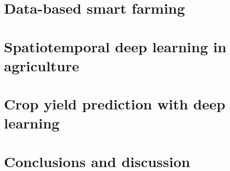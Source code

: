 \documentclass[english]{taudissertation}
\begin{document}
\chapter{Data-based smart farming}
\label{ch:smart-farming}


\chapter{Spatiotemporal deep learning in agriculture}
\label{ch:dl-in-agriculture}


\chapter{Crop yield prediction with deep learning}
\label{ch:crop-yield-prediction}


\chapter{Conclusions and discussion}
\label{ch:conclusions}


\printbibliography[heading=bibintoc, notkeyword={thisdissertation}]



% 



\publicationmatter

%
%

\end{document}
